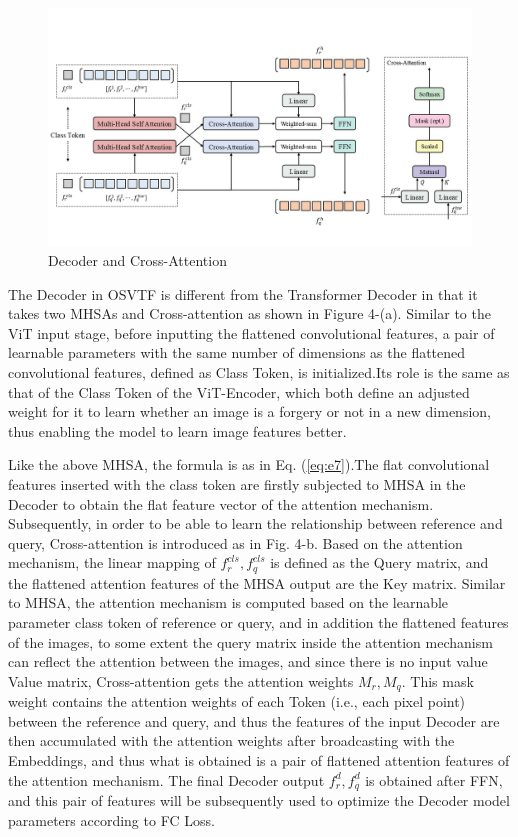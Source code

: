 \documentclass{article}
\begin{document}
\begin{figure}[htbp]
	\centering
	\includegraphics[scale=0.45]{figure/p5.jpg}
	\caption{Decoder and Cross-Attention}\label{fig:p5}
\end{figure}

The Decoder in OSVTF is different from the Transformer Decoder in that it takes two MHSAs and Cross-attention as shown in Figure 4-(a). Similar to the ViT input stage, before inputting the flattened convolutional features, a pair of learnable parameters with the same number of dimensions as the flattened convolutional features, defined as Class Token, is initialized.Its role is the same as that of the Class Token of the ViT-Encoder, which both define an adjusted weight for it to learn whether an image is a forgery or not in a new dimension, thus enabling the model to learn image features better.

Like the above MHSA, the formula is as in Eq. (\ref{eq:e7}).The flat convolutional features inserted with the class token are firstly subjected to MHSA in the Decoder to obtain the flat feature vector of the attention mechanism. Subsequently, in order to be able to learn the relationship between reference and query, Cross-attention is introduced as in Fig. 4-b. Based on the attention mechanism, the linear mapping of $f_r^{cls},f_q^{cls}$ is defined as the Query matrix, and the flattened attention features of the MHSA output are the Key matrix. Similar to MHSA, the attention mechanism is computed based on the learnable parameter class token of reference or query, and in addition the flattened features of the images, to some extent the query matrix inside the attention mechanism can reflect the attention between the images, and since there is no input value Value matrix, Cross-attention gets the attention weights $M_r ,M_q$. This mask weight contains the attention weights of each Token (i.e., each pixel point) between the reference and query, and thus the features of the input Decoder are then accumulated with the attention weights after broadcasting with the Embeddings, and thus what is obtained is a pair of flattened attention features of the attention mechanism. The final Decoder output $f_r^d,f_q^d$ is obtained after FFN, and this pair of features will be subsequently used to optimize the Decoder model parameters according to FC Loss.
\end{document}
